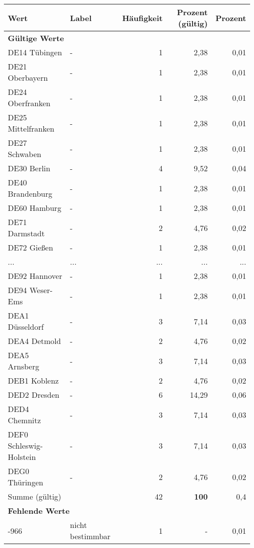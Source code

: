      \begin{longtable}{Xlrrr}
     \toprule
     \textbf{Wert} & \textbf{Label} & \textbf{Häufigkeit} & \textbf{Prozent (gültig)} & \textbf{Prozent} \\
     \endhead
     \midrule
     \multicolumn{5}{l}{\textbf{Gültige Werte}}\\
        \multicolumn{1}{X}{DE14 Tübingen} & - & 1 & 2,38 & 0,01 \\
        \multicolumn{1}{X}{DE21 Oberbayern} & - & 1 & 2,38 & 0,01 \\
        \multicolumn{1}{X}{DE24 Oberfranken} & - & 1 & 2,38 & 0,01 \\
        \multicolumn{1}{X}{DE25 Mittelfranken} & - & 1 & 2,38 & 0,01 \\
        \multicolumn{1}{X}{DE27 Schwaben} & - & 1 & 2,38 & 0,01 \\
        \multicolumn{1}{X}{DE30 Berlin} & - & 4 & 9,52 & 0,04 \\
        \multicolumn{1}{X}{DE40 Brandenburg} & - & 1 & 2,38 & 0,01 \\
        \multicolumn{1}{X}{DE60 Hamburg} & - & 1 & 2,38 & 0,01 \\
        \multicolumn{1}{X}{DE71 Darmstadt} & - & 2 & 4,76 & 0,02 \\
        \multicolumn{1}{X}{DE72 Gießen} & - & 1 & 2,38 & 0,01 \\
       ... & ... & ... & ... & ... \\
        \multicolumn{1}{X}{DE92 Hannover} & - & 1 & 2,38 & 0,01 \\
        \multicolumn{1}{X}{DE94 Weser-Ems} & - & 1 & 2,38 & 0,01 \\
        \multicolumn{1}{X}{DEA1 Düsseldorf} & - & 3 & 7,14 & 0,03 \\
        \multicolumn{1}{X}{DEA4 Detmold} & - & 2 & 4,76 & 0,02 \\
        \multicolumn{1}{X}{DEA5 Arnsberg} & - & 3 & 7,14 & 0,03 \\
        \multicolumn{1}{X}{DEB1 Koblenz} & - & 2 & 4,76 & 0,02 \\
        \multicolumn{1}{X}{DED2 Dresden} & - & 6 & 14,29 & 0,06 \\
        \multicolumn{1}{X}{DED4 Chemnitz} & - & 3 & 7,14 & 0,03 \\
        \multicolumn{1}{X}{DEF0 Schleswig-Holstein} & - & 3 & 7,14 & 0,03 \\
        \multicolumn{1}{X}{DEG0 Thüringen} & - & 2 & 4,76 & 0,02 \\
     \midrule
      \multicolumn{2}{l}{Summe (gültig)} & 42 &
      \textbf{100} &
         0,4 \\
     \multicolumn{5}{l}{\textbf{Fehlende Werte}}\\
       -966 & nicht bestimmbar & 1 & - & 0,01 \\


\end{longtable}
